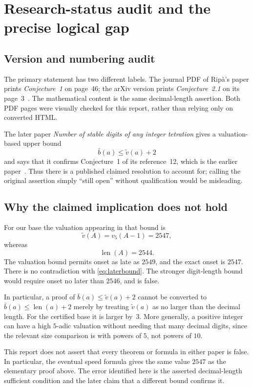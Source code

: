 \documentclass[11pt,a4paper]{article}
\theoremstyle{definition}
\theoremstyle{remark}
\newcommand{\len}{\operatorname{len}}
\begin{document}
\section{Research-status audit and the precise logical gap}
\label{sec:audit}

\subsection{Version and numbering audit}
The primary statement has two different labels. The journal PDF of Rip\`a's paper prints \emph{Conjecture~1} on page~46; the arXiv version prints \emph{Conjecture~2.1} on its page~3~\cite{Ripa2021}. The mathematical content is the same decimal-length assertion. Both PDF pages were visually checked for this report, rather than relying only on converted HTML.

The later paper \emph{Number of stable digits of any integer tetration} gives a valuation-based upper bound
\begin{equation}\label{eq:laterbound}
 \bar b(a)\le\widetilde v(a)+2
\end{equation}
and says that it confirms Conjecture~1 of its reference~12, which is the earlier paper~\cite[arXiv version, p.~10]{RipaOnnis2022}. Thus there is a published claimed resolution to account for; calling the original assertion simply ``still open'' without qualification would be misleading.

\subsection{Why the claimed implication does not hold}
For our base the valuation appearing in that bound is
\[
 \widetilde v(A)=v_5(A-1)=2547,
\]
whereas
\[
 \len(A)=2544.
\]
The valuation bound permits onset as late as $2549$, and the exact onset is $2547$. There is no contradiction with \eqref{eq:laterbound}. The stronger digit-length bound would require onset no later than $2546$, and is false.

In particular, a proof of $\bar b(a)\le\widetilde v(a)+2$ cannot be converted to $\bar b(a)\le\len(a)+2$ merely by treating $\widetilde v(a)$ as no larger than the decimal length. For the certified base it is larger by~$3$. More generally, a positive integer can have a high $5$-adic valuation without needing that many decimal digits, since the relevant size comparison is with powers of $5$, not powers of $10$.

This report does not assert that every theorem or formula in either paper is false. In particular, the eventual speed formula gives the same value $2547$ as the elementary proof above. The error identified here is the asserted decimal-length sufficient condition and the later claim that a different bound confirms it.
\end{document}
